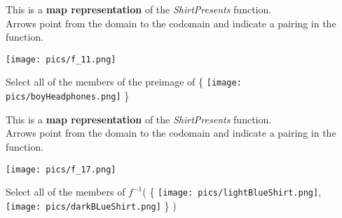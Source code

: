 \documentclass{ximera}
\author{Lee Wayand}
\begin{document}
\begin{exercise}


This is a \textbf{map representation} of the \textit{ShirtPresents} function. \\

Arrows point from the domain to the codomain and indicate a pairing in the function.

\begin{image}
\texttt{[image: pics/f\_11.png]}
\end{image}



Select all of the members of the preimage of \huge\{ \texttt{[image: pics/boyHeadphones.png]} \huge\}



\begin{selectAll}
\end{selectAll}



\end{exercise}















\begin{exercise}


This is a \textbf{map representation} of the \textit{ShirtPresents} function. \\

Arrows point from the domain to the codomain and indicate a pairing in the function.

\begin{image}
\texttt{[image: pics/f\_17.png]}
\end{image}



Select all of the members of $f^{-1}$\huge( \huge\{ \texttt{[image: pics/lightBlueShirt.png]}, \texttt{[image: pics/darkBLueShirt.png]} \huge\} \huge)



\begin{selectAll}
\end{selectAll}



\end{exercise}
\end{document}
